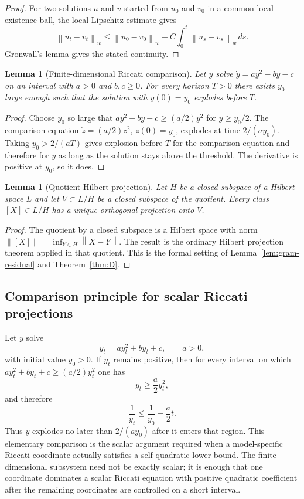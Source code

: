 \documentclass[11pt,oneside]{article}
\theoremstyle{plain}
\newtheorem{lemma}[theorem]{Lemma}
\theoremstyle{definition}
\theoremstyle{remark}
\newcommand{\norm}[1]{\left\lVert #1\right\rVert}
\begin{document}
\begin{proof}
For two solutions $u$ and $v$ started from $u_0$ and $v_0$ in a common local-existence ball, the local Lipschitz estimate gives
\[
\norm{u_t-v_t}_w\leq \norm{u_0-v_0}_w+C\int_0^t\norm{u_s-v_s}_w\,ds.
\]
Gronwall's lemma gives the stated continuity.
\end{proof}


\begin{lemma}[Finite-dimensional Riccati comparison]
\label{lem:finite-riccati-comparison-app}
Let $y$ solve $\dot y=ay^2-by-c$ on an interval with $a>0$ and $b,c\geq0$. For every horizon $T>0$ there exists $y_0$ large enough such that the solution with $y(0)=y_0$ explodes before $T$.
\end{lemma}

\begin{proof}
Choose $y_0$ so large that $ay^2-by-c\geq (a/2)y^2$ for $y\geq y_0/2$. The comparison equation $\dot z=(a/2)z^2$, $z(0)=y_0$, explodes at time $2/(ay_0)$. Taking $y_0>2/(aT)$ gives explosion before $T$ for the comparison equation and therefore for $y$ as long as the solution stays above the threshold. The derivative is positive at $y_0$, so it does.
\end{proof}

\begin{lemma}[Quotient Hilbert projection]
\label{lem:quotient-hilbert-projection}
Let $H$ be a closed subspace of a Hilbert space $L$ and let $V\subset L/H$ be a closed subspace of the quotient. Every class $[X]\in L/H$ has a unique orthogonal projection onto $V$.
\end{lemma}

\begin{proof}
The quotient by a closed subspace is a Hilbert space with norm $\norm{[X]}=\inf_{Y\in H}\norm{X-Y}$. The result is the ordinary Hilbert projection theorem applied in that quotient. This is the formal setting of Lemma~\ref{lem:gram-residual} and Theorem~\ref{thm:D}.
\end{proof}



\subsection*{Comparison principle for scalar Riccati projections}
Let $y$ solve
\[
\dot y_t=ay_t^2+by_t+c,
\qquad a>0,
\]
with initial value $y_0>0$. If $y_t$ remains positive, then for every interval on which $ay_t^2+by_t+c\geq (a/2)y_t^2$ one has
\[
\dot y_t\geq \frac a2 y_t^2,
\]
and therefore
\[
\frac1{y_t}\leq \frac1{y_0}-\frac a2t.
\]
Thus $y$ explodes no later than $2/(ay_0)$ after it enters that region. This elementary comparison is the scalar argument required when a model-specific Riccati coordinate actually satisfies a self-quadratic lower bound. The finite-dimensional subsystem need not be exactly scalar; it is enough that one coordinate dominates a scalar Riccati equation with positive quadratic coefficient after the remaining coordinates are controlled on a short interval.
\end{document}

